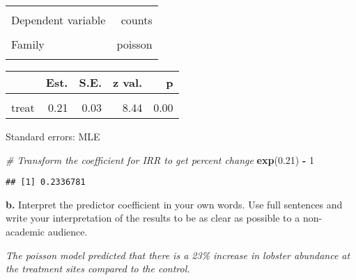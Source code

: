 \documentclass[
]{article}
\newenvironment{Shaded}{\begin{snugshade}}{\end{snugshade}}
\newcommand{\CommentTok}[1]{\textcolor[rgb]{0.56,0.35,0.01}{\textit{#1}}}
\newcommand{\DecValTok}[1]{\textcolor[rgb]{0.00,0.00,0.81}{#1}}
\newcommand{\FloatTok}[1]{\textcolor[rgb]{0.00,0.00,0.81}{#1}}
\newcommand{\FunctionTok}[1]{\textcolor[rgb]{0.13,0.29,0.53}{\textbf{#1}}}
\newcommand{\NormalTok}[1]{#1}
\newcommand{\SpecialCharTok}[1]{\textcolor[rgb]{0.81,0.36,0.00}{\textbf{#1}}}
\begin{document}
\begin{table}[!h]
\centering
\begin{tabular}{lr}
\toprule
\cellcolor{gray!10}{Observations} & \cellcolor{gray!10}{252}\\
Dependent variable & counts\\
\cellcolor{gray!10}{Type} & \cellcolor{gray!10}{Generalized linear model}\\
Family & poisson\\
\cellcolor{gray!10}{Link} & \cellcolor{gray!10}{log}\\
\bottomrule
\end{tabular}
\end{table}  \begin{table}[!h]
\centering
\begin{threeparttable}
\begin{tabular}{lrrrr}
\toprule
  & Est. & S.E. & z val. & p\\
\midrule
\cellcolor{gray!10}{(Intercept)} & \cellcolor{gray!10}{3.12} & \cellcolor{gray!10}{0.02} & \cellcolor{gray!10}{171.74} & \cellcolor{gray!10}{0.00}\\
treat & 0.21 & 0.03 & 8.44 & 0.00\\
\bottomrule
\end{tabular}
\begin{tablenotes}
\item Standard errors: MLE
\end{tablenotes}
\end{threeparttable}
\end{table}

\begin{Shaded}
\begin{Highlighting}[]
\CommentTok{\# Transform the coefficient for IRR to get percent change}
\FunctionTok{exp}\NormalTok{(}\FloatTok{0.21}\NormalTok{) }\SpecialCharTok{{-}} \DecValTok{1}
\end{Highlighting}
\end{Shaded}

\begin{verbatim}
## [1] 0.2336781
\end{verbatim}

\textbf{b.} Interpret the predictor coefficient in your own words. Use
full sentences and write your interpretation of the results to be as
clear as possible to a non-academic audience.

\emph{The poisson model predicted that there is a 23\% increase in
lobster abundance at the treatment sites compared to the control.}
\end{document}
